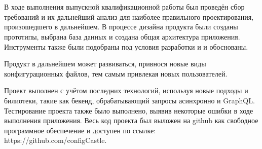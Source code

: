 \section*{}

В ходе выполнения выпускной квалификационной работы был проведён сбор требований и их дальнейший анализ
для наиболее правильного проектирования, произошедшего в дальнейшем.
В процессе дизайна продукта были созданы прототипы, выбрана база данных и создана
общая архитектура приложения. Инструменты также были подобраны под условия разработки и
и обоснованы.

Продукт в дальнейшем может развиваться, привнося новые виды конфигурационных файлов, тем самым привлекая новых пользователей.

Проект выполнен с учётом последних технологий, используя новые подходы и билиотеки, такие как бекенд, обрабатывающий запросы асинхронно и GraphQL.
Тестирование проекта также было выполнено, выявив некоторые ошибки в ходе выполнения приложения. Весь код проекта был выложен
на github как свободное программное обеспечение и доступен по ссылке: https://github.com/configCastle.